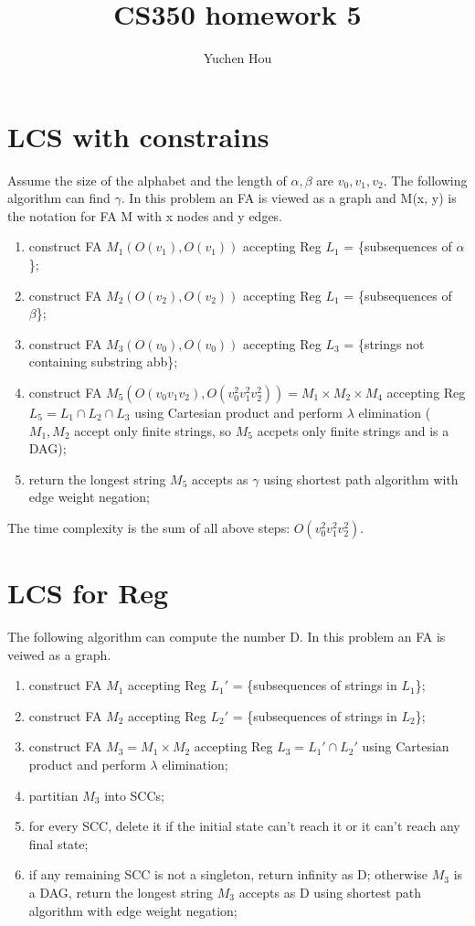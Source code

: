 \documentclass{article}
\begin{document}
\lstset{language=Java}
\title{CS350 homework 5}
\author{Yuchen Hou}
\maketitle

\section{LCS with constrains}
Assume the size of the alphabet and the length of $\alpha, \beta$ are $v_0, v_1,
v_2$. The following algorithm can find $\gamma$. In this problem an FA is viewed
as a graph and M(x, y) is the notation for FA M with x nodes and y edges.
\begin{enumerate}
  \item construct FA $M_1(O(v_1), O(v_1))$ accepting Reg $L_1$ = \{subsequences
  of $\alpha$\};
  \item construct FA $M_2(O(v_2), O(v_2))$ accepting Reg $L_1$ = \{subsequences
  of \ $\beta$\};
  \item construct FA $M_3(O(v_0), O(v_0))$ accepting Reg $L_3$ = \{strings not
  containing substring abb\};
  \item construct FA $M_5(O(v_0v_1v_2), O(v_0^2v_1^2v_2^2)) =
  M_1 \times M_2 \times M_4$ accepting Reg $L_5 = L_1 \cap L_2 \cap L_3$ using
  Cartesian product and perform $\lambda$ elimination ($M_1, M_2$ accept
  only finite strings, so $M_5$ accpets only finite strings and is a DAG);
  \item return the longest string $M_5$ accepts as $\gamma$ using shortest
  path algorithm with edge weight negation;
\end{enumerate}
The time complexity is the sum of all above steps: $O(v_0^2v_1^2v_2^2)$.

\section{LCS for Reg}
The following algorithm can compute the number D. In this problem an FA is
veiwed as a graph.
\begin{enumerate}
  \item construct FA $M_1$ accepting Reg $L_1'$ = \{subsequences of strings in
  $L_1$\};
  \item construct FA $M_2$ accepting Reg $L_2'$ = \{subsequences of strings in
  $L_2$\};
  \item construct FA $M_3  = M_1 \times M_2$ accepting Reg $L_3 = L_1' \cap
  L_2'$ using Cartesian product and perform $\lambda$ elimination;
  \item partitian $M_3$ into SCCs;
  \item for every SCC, delete it if the initial state can't reach it or it can't
  reach any final state;
  \item if any remaining SCC is not a singleton, return infinity as D; otherwise
  $M_3$ is a DAG, return the longest string $M_3$ accepts as D using shortest path
  algorithm with edge weight negation;
\end{enumerate}
\end{document}
